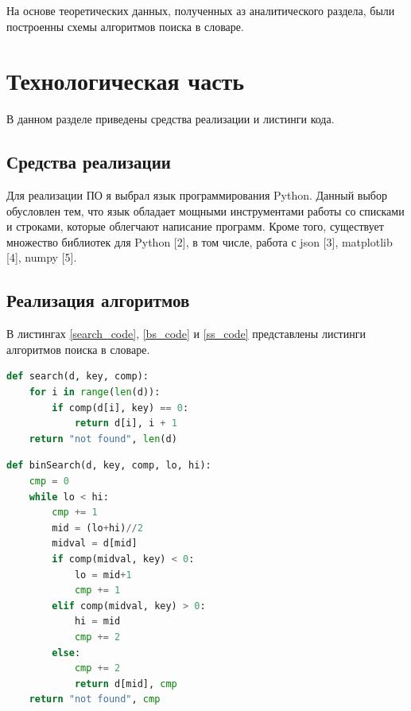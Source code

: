 \documentclass[12pt]{report}
\begin{document}
	На основе теоретических данных, полученных аз аналитического раздела, были построенны схемы алгоритмов поиска в словаре. 
	
	\chapter{Технологическая часть}
	
	В данном разделе приведены средства реализации и листинги кода.
	
	\section{Средства реализации}
	
	Для реализации ПО я выбрал язык программирования Python. Данный выбор обусловлен тем, что язык обладает мощными инструментами работы со списками и строками, которые облегчают написание программ. Кроме того, существует множество библиотек для Python [2], в том числе, работа с json [3], matplotlib [4], numpy [5].
	
\section{Реализация алгоритмов}

В листингах \ref{search_code}, \ref{bs_code} и \ref{ss_code} представлены листинги алгоритмов поиска в словаре.
	
\begin{lstlisting}[label=search_code,caption=Алгоритм линейного поиска, language=Python]
def search(d, key, comp):
    for i in range(len(d)):
        if comp(d[i], key) == 0:
            return d[i], i + 1
    return "not found", len(d)
\end{lstlisting}

\begin{lstlisting}[label = bs_code,caption=Алгоритм двоичного поиска, language=Python]
def binSearch(d, key, comp, lo, hi):
    cmp = 0
    while lo < hi:
        cmp += 1
        mid = (lo+hi)//2
        midval = d[mid]
        if comp(midval, key) < 0:
            lo = mid+1
            cmp += 1
        elif comp(midval, key) > 0: 
            hi = mid
            cmp += 2
        else:
            cmp += 2
            return d[mid], cmp
    return "not found", cmp
\end{lstlisting}
\end{document}
